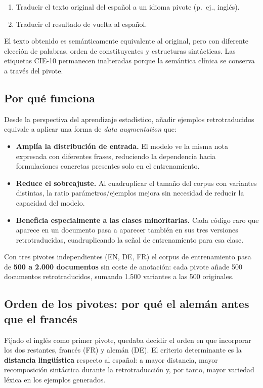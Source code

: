 \begin{enumerate}
  \item Traducir el texto original del español a un idioma pivote (p.~ej., inglés).
  \item Traducir el resultado de vuelta al español.
\end{enumerate}

El texto obtenido es semánticamente equivalente al original, pero con diferente elección de palabras, orden de constituyentes y estructuras sintácticas. Las etiquetas CIE-10 permanecen inalteradas porque la semántica clínica se conserva a través del pivote.

\subsection{Por qué funciona}

Desde la perspectiva del aprendizaje estadístico, añadir ejemplos retrotraducidos equivale a aplicar una forma de \emph{data augmentation} que:

\begin{itemize}
  \item \textbf{Amplía la distribución de entrada.} El modelo ve la misma nota expresada con diferentes frases, reduciendo la dependencia hacia formulaciones concretas presentes solo en el entrenamiento.
  \item \textbf{Reduce el sobreajuste.} Al cuadruplicar el tamaño del corpus con variantes distintas, la ratio parámetros/ejemplos mejora sin necesidad de reducir la capacidad del modelo.
  \item \textbf{Beneficia especialmente a las clases minoritarias.} Cada código raro que aparece en un documento pasa a aparecer también en sus tres versiones retrotraducidas, cuadruplicando la señal de entrenamiento para esa clase.
\end{itemize}

Con tres pivotes independientes (EN, DE, FR) el corpus de entrenamiento pasa de \textbf{500 a 2.000 documentos} sin coste de anotación: cada pivote añade 500 documentos retrotraducidos, sumando 1.500 variantes a las 500 originales.

\subsection{Orden de los pivotes: por qué el alemán antes que el francés}

Fijado el inglés como primer pivote, quedaba decidir el orden en que incorporar los dos restantes, francés (FR) y alemán (DE). El criterio determinante es la \textbf{distancia lingüística} respecto al español: a mayor distancia, mayor recomposición sintáctica durante la retrotraducción y, por tanto, mayor variedad léxica en los ejemplos generados.

